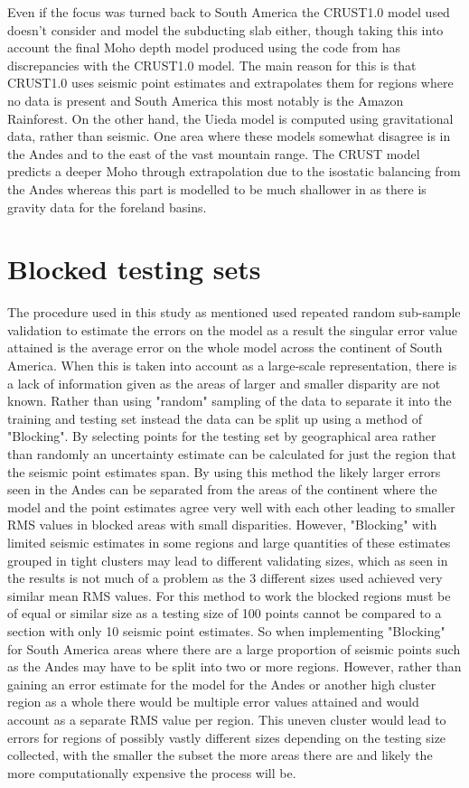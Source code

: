 Even if the focus was turned back to South America the CRUST1.0 model used \citep{Laske2013} doesn't consider and model the subducting slab either, though taking this into account the final Moho depth model produced using the code from \cite{Uieda2016} has discrepancies with the CRUST1.0 model. The main reason for this is that CRUST1.0 uses seismic point estimates and extrapolates them for regions where no data is present and South America this most notably is the Amazon Rainforest. On the other hand, the Uieda model is computed using gravitational data, rather than seismic. One area where these models somewhat disagree is in the Andes and to the east of the vast mountain range. The CRUST model predicts a deeper Moho through extrapolation due to the isostatic balancing from the Andes whereas this part is modelled to be much shallower in \cite{Uieda2016} as there is gravity data for the foreland basins.
\section{Blocked testing sets}
The procedure used in this study as mentioned used repeated random sub-sample validation to estimate the errors on the model as a result the singular error value attained is the average error on the whole model across the continent of South America. When this is taken into account as a large-scale representation, there is a lack of information given as the areas of larger and smaller disparity are not known. Rather than using "random" sampling of the data to separate it into the training and testing set instead the data can be split up using a method of "Blocking". By selecting points for the testing set by geographical area rather than randomly an uncertainty estimate can be calculated for just the region that the seismic point estimates span. By using this method the likely larger errors seen in the Andes can be separated from the areas of the continent where the model and the point estimates agree very well with each other leading to smaller RMS values in blocked areas with small disparities. However, "Blocking" with limited seismic estimates in some regions and large quantities of these estimates grouped in tight clusters may lead to different validating sizes, which as seen in the results is not much of a problem as the 3 different sizes used achieved very similar mean RMS values. For this method to work the blocked regions must be of equal or similar size as a testing size of 100 points cannot be compared to a section with only 10 seismic point estimates. So when implementing "Blocking" for South America areas where there are a large proportion of seismic points such as the Andes may have to be split into two or more regions. However, rather than gaining an error estimate for the model for the Andes or another high cluster region as a whole there would be multiple error values attained and would account as a separate RMS value per region. This uneven cluster would lead to errors for regions of possibly vastly different sizes depending on the testing size collected, with the smaller the subset the more areas there are and likely the more computationally expensive the process will be.
